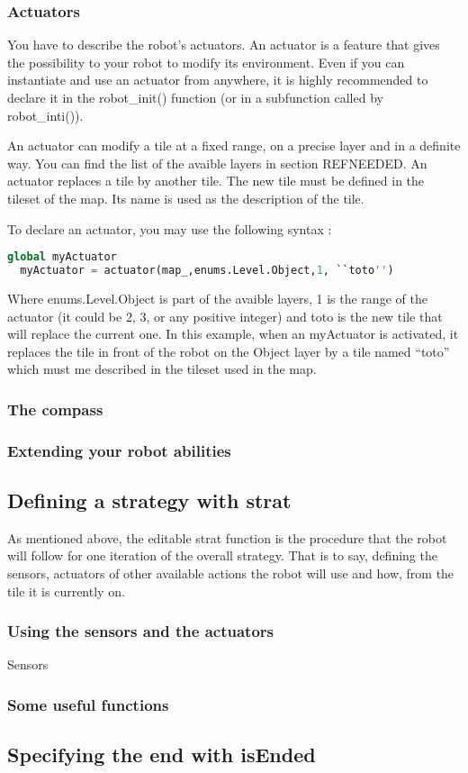 \documentclass[a4paper,11pt]{article}
\begin{document}
\subsubsection{Actuators}

You have to describe the robot's actuators. An actuator is a feature
that gives the possibility to your robot to modify its
environment. Even if you can instantiate and use an actuator from
anywhere, it is highly recommended to declare it in the robot\_init()
function (or in a subfunction called by robot\_inti()).

An actuator can modify a tile at a fixed range, on a precise layer and
in a definite way. You can find the list of the avaible layers in
section REFNEEDED. An actuator replaces a tile by another tile. The
new tile must be defined in the tileset of the map. Its name is used
as the description of the tile.

To declare an actuator, you may use the following syntax :

\begin{lstlisting}[language=Python]
  global myActuator
  myActuator = actuator(map_,enums.Level.Object,1, ``toto'')
\end{lstlisting}

Where enums.Level.Object is part of the avaible layers, 1 is the range
of the actuator (it could be 2, 3, or any positive integer) and toto
is the new tile that will replace the current one. In this example,
when an myActuator is activated, it replaces the tile in front of the
robot on the Object layer by a tile named ``toto'' which must me
described in the tileset used in the map.


\subsubsection{The compass}


\subsubsection{Extending your robot abilities}

\subsection{Defining a strategy with strat}
As mentioned above, the editable strat function is the procedure 
that the robot will follow for one iteration of the overall strategy.
That is to say, defining the sensors, actuators of other available actions 
the robot will use and how, from the tile it is currently on.

\subsubsection{Using the sensors and the actuators}
Sensors 
\subsubsection{Some useful functions}

\subsection{Specifying the end with isEnded}
\end{document}
